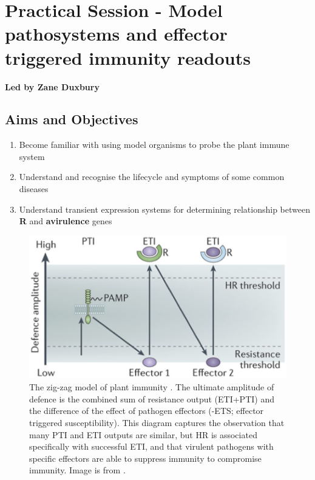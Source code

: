 \documentclass[12pt,]{book}
\providecommand{\tightlist}{%
  \setlength{\itemsep}{0pt}\setlength{\parskip}{0pt}}
\theoremstyle{definition}
\theoremstyle{definition}
\theoremstyle{remark}
\begin{document}
\section*{Practical Session - Model pathosystems and effector triggered
immunity
readouts}\label{practical-session---model-pathosystems-and-effector-triggered-immunity-readouts}

\textbf{Led by Zane Duxbury}

\subsection*{Aims and Objectives}\label{aims-and-objectives}

\begin{enumerate}
\def\labelenumi{\arabic{enumi}.}
\tightlist
\item
  Become familiar with using model organisms to probe the plant immune
  system
\item
  Understand and recognise the lifecycle and symptoms of some common
  diseases
\item
  Understand transient expression systems for determining relationship
  between \textbf{R} and \textbf{avirulence} genes
\end{enumerate}










\begin{figure}
\includegraphics[width=9.78in]{assets/jones_fig1_prac} \caption{The zig-zag model of plant immunity \citep{Jones:2006ih}.
The ultimate amplitude of defence is the combined sum of resistance
output (ETI+PTI) and the difference of the effect of pathogen effectors
(-ETS; effector triggered susceptibility). This diagram captures the
observation that many PTI and ETI outputs are similar, but HR is
associated specifically with successful ETI, and that virulent pathogens
with specific effectors are able to suppress immunity to compromise
immunity. Image is from \citet{Pumplin:2013ix}.}\label{fig:zigzag}
\end{figure}
\end{document}
